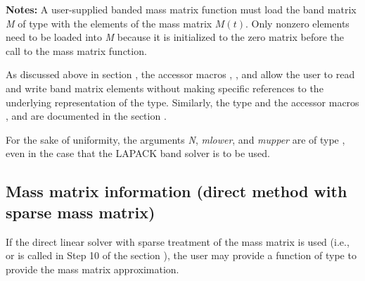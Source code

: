 \documentclass[letterpaper,10pt,english]{sphinxmanual}
\begin{document}
\begin{fulllineitems}
\textbf{Notes:} A user-supplied banded mass matrix function must load
the band matrix \emph{M} of type  with the elements of the
mass matrix \(M(t)\). Only nonzero elements need to be loaded
into \emph{M} because it is initialized to the zero matrix before the
call to the mass matrix function.

As discussed above in section {\hyperref[c_interface/User_supplied:cinterface-bandjacobianfn]{\emph{}}},
the accessor macros , , and
 allow the user to read and write band matrix
elements without making specific references to the underlying
representation of the  type.  Similarly, the 
type and the accessor macros ,  and
 are documented in the section
{\hyperref[linear_solvers/index:linearsolvers]{\emph{}}}.

For the sake of uniformity, the arguments \emph{N}, \emph{mlower}, and
\emph{mupper} are of type , even in the case that the
LAPACK band solver is to be used.

\end{fulllineitems}



\subsection{Mass matrix information (direct method with sparse mass matrix)}
\label{c_interface/User_supplied:mass-matrix-information-direct-method-with-sparse-mass-matrix}\label{c_interface/User_supplied:cinterface-sparsemassfn}
If the direct linear solver with sparse treatment of the mass matrix
is used (i.e., {\hyperref[c_interface/User_callable:c.ARKMassKLU]{\emph{}}} or {\hyperref[c_interface/User_callable:c.ARKMassSuperLUMT]{\emph{}}}
is called in Step 10 of the section {\hyperref[c_interface/Skeleton:cinterface-skeleton]{\emph{}}}), the
user may provide a function of type {\hyperref[c_interface/User_supplied:c.ARKSlsSparseMassFn]{\emph{}}} to
provide the mass matrix approximation.
\end{document}
